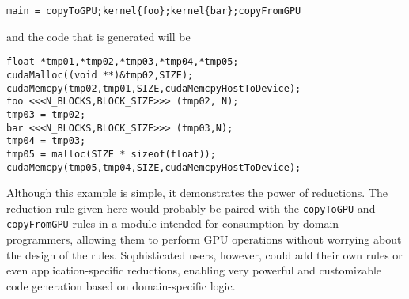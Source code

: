 \begin{verbatim}
main = copyToGPU;kernel{foo};kernel{bar};copyFromGPU
\end{verbatim}

and the code that is generated will be

\begin{verbatim}
float *tmp01,*tmp02,*tmp03,*tmp04,*tmp05;
cudaMalloc((void **)&tmp02,SIZE);
cudaMemcpy(tmp02,tmp01,SIZE,cudaMemcpyHostToDevice);
foo <<<N_BLOCKS,BLOCK_SIZE>>> (tmp02, N);
tmp03 = tmp02;
bar <<<N_BLOCKS,BLOCK_SIZE>>> (tmp03,N);
tmp04 = tmp03;
tmp05 = malloc(SIZE * sizeof(float));
cudaMemcpy(tmp05,tmp04,SIZE,cudaMemcpyHostToDevice);
\end{verbatim}

Although this example is simple, it demonstrates the power of reductions. The reduction rule given here would probably be paired with the \texttt{copyToGPU} and \texttt{copyFromGPU} rules in a module intended for consumption by domain programmers, allowing them to perform GPU operations without worrying about the design of the rules. Sophisticated users, however, could add their own rules or even application-specific reductions, enabling very powerful and customizable code generation based on domain-specific logic.
